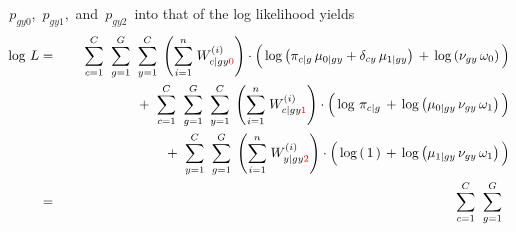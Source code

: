 \begin{enumerate}
\,$p_{gy0}$,
\,$p_{gy1}$,
\,and
\,$p_{gy2}$
\,into that of the log likelihood yields
\begin{eqnarray*}
\log\,L
&=&
	{\color{white}+} \;\;
	\overset{C}{\underset{c=1}{\sum}}\;\;
	\overset{G}{\underset{g=1}{\sum}}\;\;
	\overset{C}{\underset{y=1}{\sum}}\;
	\left(\overset{n}{\underset{i=1}{\sum}}\;W^{(i)}_{c \vert gy{\color{red}0}}\right)
	\cdot
	\left(\,
		\log\left(\pi_{c \vert g}\,\mu_{0 \vert gy} + \delta_{cy}\,\mu_{1\vert gy}\right)
		\,\overset{{\color{white}.}}{+}\,
		\log\left(\nu_{gy}\,\omega_{0}\right)
	\,\right)
\\
&&
	+ \;\;
	\overset{C}{\underset{c=1}{\sum}}\;\;
	\overset{G}{\underset{g=1}{\sum}}\;\;
	\overset{C}{\underset{y=1}{\sum}}\;
	\left(\overset{n}{\underset{i=1}{\sum}}\;W^{(i)}_{c \vert gy{\color{red}1}}\right)
	\cdot
	\left(\,
		\log\,\pi_{c \vert g}
		\,\overset{{\color{white}.}}{+}\,
		\log\left(\mu_{0\vert gy}\,\nu_{gy}\,\omega_{1}\right)
	\,\right)
\\
&&
	+ \;\;
	\overset{C}{\underset{y=1}{\sum}}\;\;
	\overset{G}{\underset{g=1}{\sum}}\;
	\left(\overset{n}{\underset{i=1}{\sum}}\;W^{(i)}_{y \vert gy{\color{red}2}}\right)
	\cdot
	\left(\,
		\log\left(\,1\,\right)
		\,\overset{{\color{white}.}}{+}\,
		\log\left(\mu_{1 \vert gy}\,\nu_{gy}\,\omega_{1}\right)
	\,\right)
\\
&=&
	{\color{white}+} \;\;
	\overset{C}{\underset{c=1}{\sum}}\;\;
	\overset{G}{\underset{g=1}{\sum}}\;\;

\end{eqnarray*}
\end{enumerate}

